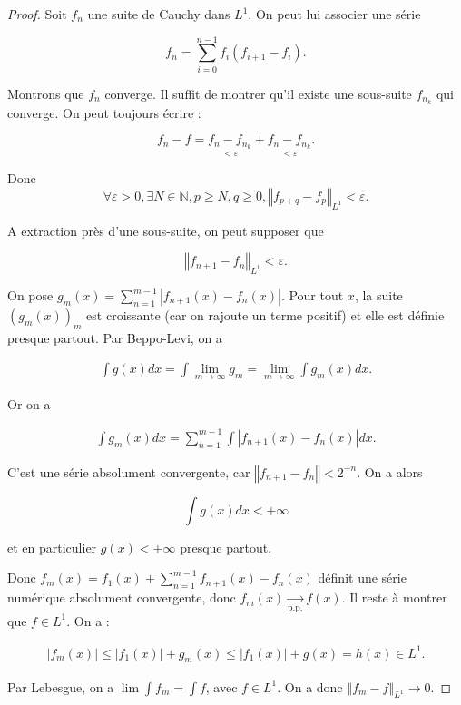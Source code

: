\documentclass[french]{book}
\theoremstyle{definition}
\theoremstyle{remark}
\newcommand{\lesss}{<}
\newcommand{\less}{\lesss}
\newcommand{\biggg}{>}
\newcommand{\bg}{\biggg}
\begin{document}
\begin{proof}
  Soit \(f_n\) une suite de Cauchy dans \(L ^{1}\). On peut lui associer une série

  \[f_n = \sum_{i=0}^{n-1} f_i (f _{i+1} -f_i).\]

  Montrons que \(f_n\) converge. Il suffit de montrer qu'il existe une sous-suite \(f _{n_k}\) qui converge. On peut toujours écrire :

  \[f_n - f = \underset{\less \varepsilon}{f_n - f _{n_k}} + \underset{\less \varepsilon}{f_n - f _{n_k}}.\]

  Donc \[\forall \varepsilon \bg 0, \exists N \in \mathbb{N}, p \geq  N, q \geq 0, \left\Vert f _{p+q} - f _{p} \right\Vert _{L ^{1}} \less \varepsilon.\]

  A extraction près d'une sous-suite, on peut supposer que

  \[\left\Vert f _{n+1}-f_n \right\Vert _{L ^{1}} \less \varepsilon.\]

  On pose \(g _{m}(x) = \displaystyle \sum_{n=1}^{m-1} \left\lvert f _{n+1}(x) - f_n(x) \right\rvert \). Pour tout \(x\), la suite \((g_m(x))_{m}\) est croissante (car on rajoute un terme positif) et elle est définie presque partout. Par Beppo-Levi, on a

  \begin{gather*}
    \int g(x) dx = \int \lim_{m \to \infty} g_m = \lim_{m \to \infty} \int g_m(x)dx.
  \end{gather*}

  Or on a

  \begin{gather*}
    \int g_m(x)dx = \sum_{n=1}^{m-1} \int \left\lvert f _{n+1}(x)-f_n(x) \right\rvert dx.
  \end{gather*}

  C'est une série absolument convergente, car \(\left\Vert f _{n+1}-f_n \right\Vert \less 2 ^{-n}\). On a alors

  \[\int g(x)dx \less +\infty\]

  et en particulier \(g(x) \less +\infty\) presque partout.

  Donc \(f_m(x) = f_1(x) + \displaystyle \sum_{n=1}^{m-1} f _{n+1}(x) - f_n(x)\) définit une série numérique absolument convergente, donc \(f_m(x) \underset{\text{p.p.}}{\longrightarrow} f(x)\). Il reste à montrer que \(f \in L ^{1}\). On a :

  \begin{gather*}
    \left\lvert f_m(x) \right\rvert \leq \left\lvert f_1(x) \right\rvert + g_m(x) \leq \left\lvert f_1(x) \right\rvert + g(x) = h(x) \in L ^{1}.
  \end{gather*}

  Par Lebesgue, on a \(\lim \int f_m = \int f\), avec \(f \in L ^{1}\). On a donc \(\left\Vert f_m - f \right\Vert _{L ^{1}} \longrightarrow 0\).
\end{proof}
\end{document}
